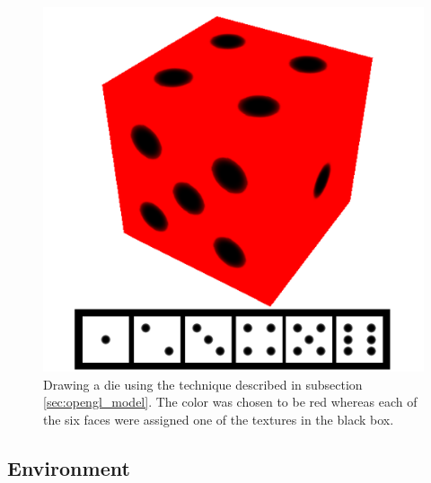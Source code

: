 \begin{figure}[h]
\begin{center}
\includegraphics[width=\textwidth, trim=0cm 0cm 0cm 0cm, clip]{opengl/figures/die.png}
\end{center}
\caption{Drawing a die using the technique described in subsection \ref{sec:opengl_model}. The color was chosen to be red whereas each of the six faces were assigned one of the textures in the black box.}
\label{fig:opengl_die}
\end{figure}
\subsection{Environment}
